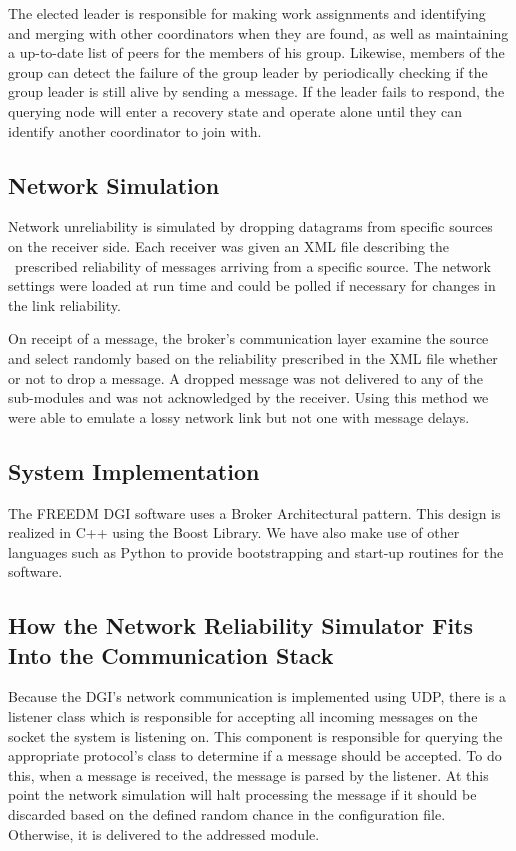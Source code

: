 
The elected leader is responsible for making work assignments and identifying and merging with other coordinators when they are found, as well as maintaining a up-to-date list of peers for the members of his group.  Likewise, members of the group can detect the failure of the group leader by periodically checking if the group leader is still alive by sending a message. If the leader fails to respond, the querying node will enter a recovery state and operate alone until they can identify another coordinator to join with.
\subsection{Network Simulation}

Network unreliability is simulated by dropping datagrams from specific sources on the receiver side. Each receiver was given an XML file describing the  prescribed reliability of messages arriving from a specific source. The network settings were loaded at run time and could be polled if necessary for changes in the link reliability.

On receipt of a message, the broker's communication layer examine the source and select randomly based on the reliability prescribed in the XML file whether or not to drop a message. A dropped message was not delivered to any of the sub-modules and was not acknowledged by the receiver. Using this method we were able to emulate a lossy network link but not one with message delays.

\subsection{System Implementation}

The FREEDM DGI software uses a Broker Architectural pattern. This design is realized in C++ using the Boost Library\cite{BOOST}. We have also make use of other languages such as Python to provide bootstrapping and start-up routines for the software.

\subsection{How the Network Reliability Simulator Fits Into the Communication Stack}

Because the DGI's network communication is implemented using UDP, there is a listener class which is responsible for accepting all incoming messages on the socket the system is listening on. This component is responsible for querying the appropriate protocol's class to determine
if a message should be accepted. To do this, when a message is received, the message is parsed by the listener. At this point the network simulation will halt processing the  message if it should be discarded based on the defined random chance in the configuration file. Otherwise, it is delivered to the addressed module.
